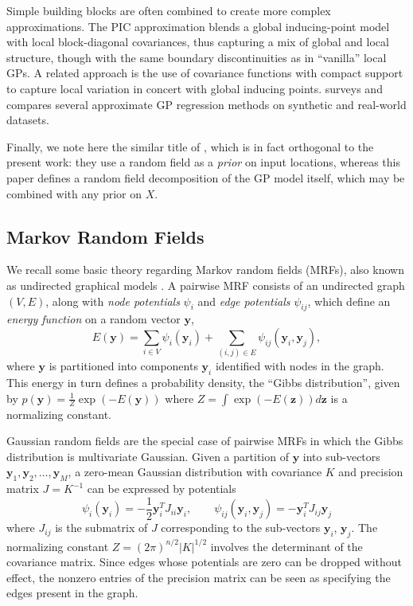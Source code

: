 \documentclass{article}
\renewcommand{\v}[1]{\mathbf{#1}}
\begin{document}
Simple building blocks are often combined to create more complex
approximations. 
The PIC approximation \cite{snelson2007} blends a global
inducing-point model with local block-diagonal covariances, 
thus capturing a mix of global and local
structure, though with the same boundary discontinuities as in
``vanilla'' local GPs. A related approach is the use of covariance
functions with compact support \cite{vanhatalo2008} to capture local
variation in concert with global inducing points. \cite{chalupka2012} surveys and compares
several approximate GP regression methods on synthetic and real-world
datasets. 

Finally, we note here the similar title of \cite{zhong2010gaussian},
which is in fact orthogonal to the present work: they use a random
field as a {\em prior} on input locations, whereas this paper defines a
random field decomposition of the GP model itself, which may be
combined with any prior on $X$.

\subsection{Markov Random Fields}

We recall some basic theory regarding Markov random fields
(MRFs), also known as undirected graphical models \cite{koller2009probabilistic}. A pairwise
MRF consists of an undirected graph $(V, E)$, along with {\em node potentials} $\psi_i$ and {\em edge
potentials} $\psi_{ij}$, which define an {\em energy function} on a random vector $\v{y}$,
\begin{equation}
E(\v{y}) = \sum_{i\in V} \psi_{i}(\v{y}_i) + \sum_{(i,j)\in E}
\psi_{ij}(\v{y}_i, \v{y}_j),\label{eqn:mrf}
\end{equation}
where $\v{y}$ is partitioned into components
$\v{y}_i$ identified with nodes in the graph. This energy in turn defines a
probability density, the ``Gibbs
distribution'', given by $p(\v{y}) = \frac{1}{Z}\exp(-E(\v{y}))$ where
$Z = \int \exp(-E(\v{z})) d\v{z}$ is a normalizing constant.

Gaussian random fields are the special case of pairwise MRFs in which
the Gibbs distribution is multivariate Gaussian. Given a partition of
$\v{y}$ into sub-vectors $\v{y}_1, \v{y}_2, \ldots, \v{y}_M$, a
zero-mean Gaussian distribution with covariance $K$ and precision
matrix $J = K^{-1}$ can
be expressed by potentials 
\begin{equation}
\psi_i(\v{y}_i) = -\frac{1}{2}\v{y}_i^T
J_{ii} \v{y}_i, \qquad\psi_{ij}(\v{y}_i, \v{y}_j) = -\v{y}_i^T J_{ij}
\v{y}_j \label{eqn:gaussian-mrf}
\end{equation} where $J_{ij}$ is the submatrix of $J$ corresponding
to the sub-vectors $\v{y}_i$, $\v{y}_j$. The
normalizing constant $Z =
(2\pi)^{n/2}|K|^{1/2}$ involves the determinant of the covariance
matrix. Since edges whose potentials are zero can be dropped without
effect, the nonzero entries of the precision matrix can be seen as
specifying the edges present in the graph. 
\end{document}
